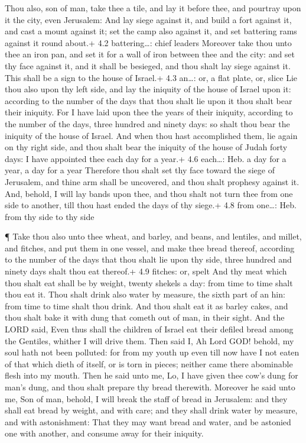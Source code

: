  Thou also, son of man, take thee a tile, and lay it before
thee, and pourtray upon it the city, even Jerusalem:  And
lay siege against it, and build a fort against it, and cast a mount
against it; set the camp also against it, and set battering rams against
it round about.+ 4.2 battering\ldots: chief leaders 
Moreover take thou unto thee an iron pan, and set it for a wall of iron
between thee and the city: and set thy face against it, and it shall be
besieged, and thou shalt lay siege against it. This shall be a sign to
the house of Israel.+ 4.3 an\ldots: or, a flat plate, or, slice
 Lie thou also upon thy left side, and lay the iniquity of
the house of Israel upon it: according to the number of the days that
thou shalt lie upon it thou shalt bear their iniquity.  For
I have laid upon thee the years of their iniquity, according to the
number of the days, three hundred and ninety days: so shalt thou bear
the iniquity of the house of Israel.  And when thou hast
accomplished them, lie again on thy right side, and thou shalt bear the
iniquity of the house of Judah forty days: I have appointed thee each
day for a year.+ 4.6 each\ldots: Heb. a day for a year, a day for a year
 Therefore thou shalt set thy face toward the siege of
Jerusalem, and thine arm shall be uncovered, and thou shalt prophesy
against it.  And, behold, I will lay bands upon thee, and
thou shalt not turn thee from one side to another, till thou hast ended
the days of thy siege.+ 4.8 from one\ldots: Heb. from thy side to thy
side

 ¶ Take thou also unto thee wheat, and barley, and beans,
and lentiles, and millet, and fitches, and put them in one vessel, and
make thee bread thereof, according to the number of the days that thou
shalt lie upon thy side, three hundred and ninety days shalt thou eat
thereof.+ 4.9 fitches: or, spelt  And thy meat which thou
shalt eat shall be by weight, twenty shekels a day: from time to time
shalt thou eat it.  Thou shalt drink also water by measure,
the sixth part of an hin: from time to time shalt thou drink.
 And thou shalt eat it as barley cakes, and thou shalt bake
it with dung that cometh out of man, in their sight.  And
the LORD said, Even thus shall the children of Israel eat their defiled
bread among the Gentiles, whither I will drive them.  Then
said I, Ah Lord GOD! behold, my soul hath not been polluted: for from my
youth up even till now have I not eaten of that which dieth of itself,
or is torn in pieces; neither came there abominable flesh into my mouth.
 Then he said unto me, Lo, I have given thee cow's dung for
man's dung, and thou shalt prepare thy bread therewith. 
Moreover he said unto me, Son of man, behold, I will break the staff of
bread in Jerusalem: and they shall eat bread by weight, and with care;
and they shall drink water by measure, and with astonishment:
 That they may want bread and water, and be astonied one
with another, and consume away for their iniquity.

